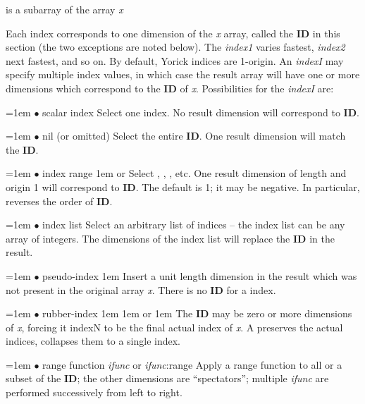 
       {is a subarray of the array {\it x}}

Each index corresponds to one dimension of the {\it x} array, called
the {\bf ID} in this section (the two exceptions are noted below).
The {\it index1\/} varies fastest, {\it index2\/} next fastest, and so
on.  By default, Yorick indices are 1-origin.  An {\it indexI\/} may
specify multiple index values, in which case the result array will
have one or more dimensions which correspond to the {\bf ID} of
{\it x}.  Possibilities for the {\it indexI} are:

\hangindent=1em
$\bullet$ scalar index \hfil\break
Select one index.  No result dimension will correspond to {\bf ID}.

\hangindent=1em
$\bullet$ nil (or omitted) \hfil\break
Select the entire {\bf ID}.  One result dimension will match the {\bf ID}.

\hangindent=1em
$\bullet$ index range \hglue 1em  or
 \hfil\break
Select , , , etc.  One
result dimension of length  and origin 1
will correspond to {\bf ID}.  The default  is 1; it may be
negative.  In particular,  reverses the order of {\bf ID}.

\hangindent=1em
$\bullet$ index list \hfil\break
Select an arbitrary list of indices -- the index list can be any array of
integers.  The dimensions of the index list will replace the {\bf ID} in
the result.

\hangindent=1em
$\bullet$ pseudo-index \hglue 1em \kbd{-} \hfil\break
Insert a unit length dimension in the result which was not present in the
original array {\it x}.  There is no {\bf ID} for a \kbd{-} index.

\hangindent=1em
$\bullet$ rubber-index \hglue 1em  \hglue 1em or
                       \hglue 1em \kbd{*} \hfil\break
The {\bf ID} may be zero or more dimensions of {\it x}, forcing {it indexN\/}
to be the final actual index of {\it x}.  A  preserves the actual
indices, \kbd{*} collapses them to a single index.

\hangindent=1em
$\bullet$ range function {\it ifunc\/} or {\it ifunc\/}:range \hfil\break
Apply a range function to all or a subset of the {\bf ID}; the other
dimensions are ``spectators''; multiple {\it ifunc\/} are performed
successively from left to right.

